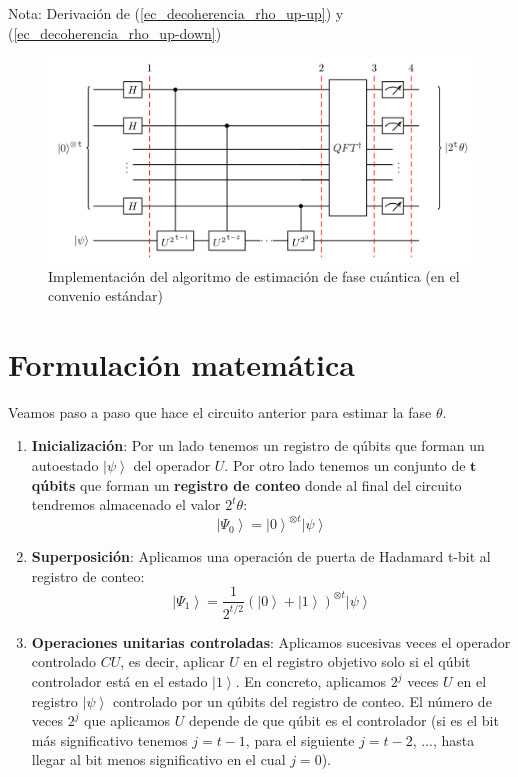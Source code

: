 \documentclass[a4paper,11pt]{book} %
\numberwithin{equation}{chapter}
\begin{document}
\begin{mybox_blue}{Nota: Derivación de (\ref{ec_decoherencia_rho_up-up}) y  (\ref{ec_decoherencia_rho_up-down})}
\begin{figure}[t]
\centering 
\includegraphics[width=0.8\linewidth]{Figuras/Fig-QPE-Circuito.png}
\caption{Implementación del algoritmo de estimación de fase cuántica (en el convenio estándar)}
\label{Fig-QPE}
\end{figure}



\section{Formulación matemática}


Veamos paso a paso que hace el circuito anterior para estimar la fase $\theta$.

\begin{enumerate}
	\item \textbf{Inicialización}: Por un lado tenemos un registro de qúbits que forman un autoestado $\left| \psi \right\rangle$ del operador $U$. Por otro lado tenemos un conjunto de $\bm t$ \textbf{qúbits} que forman un \textbf{registro de conteo} donde al final del circuito tendremos almacenado el valor $2^t \theta$:
$$
\left| \Psi_0 \right\rangle = \left| 0 \right\rangle^{\otimes t} \left| \psi \right\rangle
$$

	\item \textbf{Superposición}: Aplicamos una operación de puerta de Hadamard t-bit al registro de conteo:
$$
\left| \Psi_1 \right\rangle = \frac{1}{2^{t/2}}  \left( \left| 0 \right\rangle + \left| 1 \right\rangle \right)^{\otimes t} \left| \psi \right\rangle
$$

	\item \textbf{Operaciones unitarias controladas}: Aplicamos sucesivas veces el operador controlado $CU$, es decir, aplicar $U$ en el registro objetivo solo si el qúbit controlador está en el estado $\left| 1 \right\rangle$. En concreto, aplicamos $2^{j}$ veces $U$ en el registro $\left| \psi \right\rangle$ controlado por un qúbits del registro de conteo. El número de veces $2^{j}$ que aplicamos $U$ depende de que qúbit es el controlador (si es el bit más significativo tenemos $j = t-1$, para el siguiente $j = t-2$, ..., hasta llegar al bit menos significativo en el cual $j=0$). 
	

\end{enumerate}
\end{mybox_blue}
\end{document}

